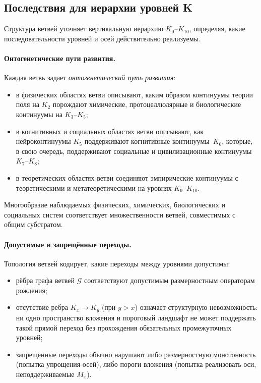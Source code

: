 \subsection{Последствия для иерархии уровней K}

Структура ветвей уточняет вертикальную иерархию \(K_0\)–\(K_{10}\), определяя,
какие последовательности уровней и осей действительно реализуемы.

\paragraph{Онтогенетические пути развития.}
Каждая ветвь задает \emph{онтогенетический путь развития}:
\begin{itemize}
  \item в физических областях ветви описывают, каким образом континуумы
        теории поля на \(K_2\) порождают химические, протоцеллюлярные и
        биологические континуумы на \(K_3\)–\(K_5\);
  \item в когнитивных и социальных областях ветви описывают, как
        нейроконтинуумы \(K_5\) поддерживают когнитивные континуумы\,
        \(K_6\), которые, в свою очередь, поддерживают социальные и
        цивилизационные континуумы \(K_7\)–\(K_8\);
  \item в теоретических областях ветви соединяют эмпирические континуумы
        с теоретическими и метатеоретическими на уровнях \(K_9\)–\(K_{10}\).
\end{itemize}
Многообразие наблюдаемых физических, химических, биологических и социальных
систем соответствует множественности ветвей, совместимых с общим субстратом.

\paragraph{Допустимые и запрещённые переходы.}
Топология ветвей кодирует, какие переходы между уровнями допустимы:
\begin{itemize}
  \item рёбра графа ветвей \(\mathcal{G}\) соответствуют допустимым
        размерностным операторам рождения;
  \item отсутствие ребра \(K_x \to K_y\) (при \(y>x\)) означает
        структурную невозможность: ни одно пространство вложения и пороговый
        ландшафт не может поддержать такой прямой переход без прохождения
        обязательных промежуточных уровней;
  \item запрещенные переходы обычно нарушают либо размерностную монотонность
        (попытка упрощения осей), либо пороги вложения
        (попытка реализовать оси, неподдерживаемые \(M_x\)).
\end{itemize}

